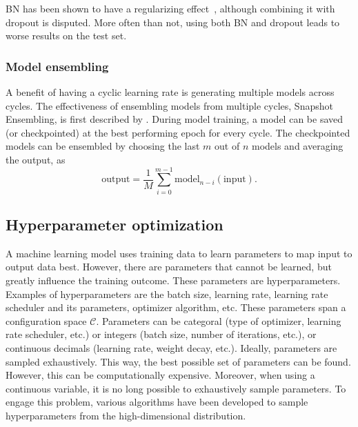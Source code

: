 BN has been shown to have a regularizing effect~\cite{Bjorck2018}, although combining it with dropout is disputed.
More often than not, using both BN and dropout leads to worse results on the test set.

\subsubsection{Model ensembling}\label{subsec:model_ensembling}
A benefit of having a cyclic learning rate is generating multiple models across cycles.
The effectiveness of ensembling models from multiple cycles, Snapshot Ensembling, is first described by \textcite{Huang2017}.
During model training, a model can be saved (or checkpointed) at the best performing epoch for every cycle.
The checkpointed models can be ensembled by choosing the last $m$ out of $n$ models and averaging the output, as
\begin{equation}
    \mathrm{output} = \frac{1}{M} \sum_{i=0}^{m-1} \mathrm{model}_{n-i}(\mathrm{input}).
\end{equation}


\subsection{Hyperparameter optimization}\label{sec:hparam}

A machine learning model uses training data to learn parameters to map input to output data best.
However, there are parameters that cannot be learned, but greatly influence the training outcome.
These parameters are hyperparameters.
Examples of hyperparameters are the batch size, learning rate, learning rate scheduler and its parameters, optimizer algorithm, etc.
These parameters span a configuration space $\mathcal{C}$.
Parameters can be categoral (type of optimizer, learning rate scheduler, etc.) or integers (batch size, number of iterations, etc.), or continuous decimals (learning rate, weight decay, etc.).
Ideally, parameters are sampled exhaustively.
This way, the best possible set of parameters can be found.
However, this can be computationally expensive.
Moreover, when using a continuous variable, it is no long possible to exhaustively sample parameters.
To engage this problem, various algorithms have been developed to sample hyperparameters from the high-dimensional distribution.

